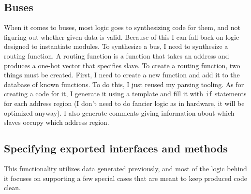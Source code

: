 \documentclass[12pt]{report}
\begin{document}
\subsection{Buses}
When it comes to buses, most logic goes to synthesizing code for them, and not figuring out whether given data is valid. Because of this I can fall back on logic designed to instantiate modules. To synthesize a bus, I need to synthesize a routing function.
A routing function is a function that takes an address and produces a one-hot vector that specifies slave. 
To create a routing function, two things must be created. First, I need to create a new function and add it to the database of known functions. To do this, I just reused my parsing tooling. As for creating a code for it, I generate it using a template and fill it with \verb!if! statements for each address region (I don't need to do fancier logic as in hardware, it will be optimized anyway). I also generate comments giving information about which slaves occupy which address region.

\subsection{Specifying exported interfaces and methods}
This functionality utilizes data generated previously, and most of the logic behind it focuses on supporting a few special cases that are meant to keep produced code clean.
\end{document}

